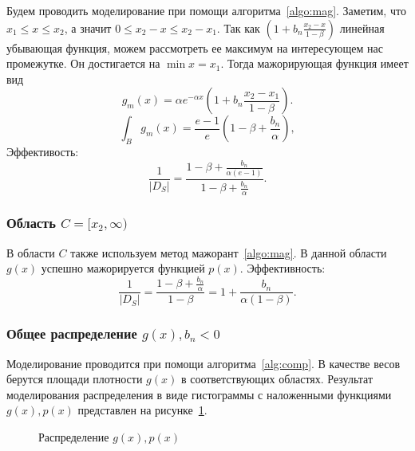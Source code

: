 \documentclass[12pt, specialist, subf, substylefile = spbu.rtx]{disser}
\begin{document}
Будем проводить моделирование при помощи алгоритма~\ref{algo:mag}. Заметим, что $x_1 \le x \le x_2$, а значит $0 \le x_2-x \le x_2-x_1$.
Так как $(1+b_n \frac{x_2-x}{1-\beta})$ линейная убывающая функция, можем рассмотреть ее максимум на интересующем нас промежутке. Он достигается на $\min x = x_1$. Тогда мажорирующая функция имеет вид
$$
g_m(x)=\alpha e^{-\alpha x}(1+b_n \frac{x_2-x_1}{1-\beta}).
$$
$$
\int_B g_m(x)=\frac{e-1}{e}(1-\beta+\frac{b_n}{\alpha}),
$$
Эффективость:
$$
\frac{1}{|D_S|}=\frac{1-\beta+\frac{b_n}{\alpha(e-1)}}{1-\beta+\frac{b_n}{\alpha}}.
$$



\subsubsection{Область $C=[x_2, \infty)$}

В области $C$ также используем метод мажорант~\ref{algo:mag}. В данной области $g(x)$ успешно мажорируется функцией $p(x)$. Эффективность:
$$
\frac{1}{|D_S|}=\frac{1-\beta+\frac{b_n}{\alpha}}{1-\beta}=1+\frac{b_n}{\alpha(1-\beta)}.
$$



\subsubsection{Общее распределение $g(x), b_n < 0$}

Моделирование проводится при помощи алгоритма~\ref{alg:comp}. В качестве весов берутся площади плотности $g(x)$ в соответствующих областях. Результат моделирования распределения в виде гистограммы с наложенными функциями $g(x), p(x)$ представлен на рисунке~\ref{ris:hist2}. 

\begin{figure}[h]
\caption{Распределение $g(x), p(x)$}
\label{ris:hist2}
\end{figure}
\end{document}
